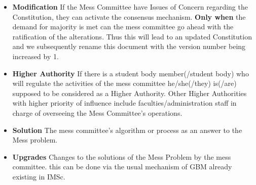 \documentclass[12pt]{report}
\begin{document}
\begin{itemize}
\item{\textbf{Modification}\label{mod}} If the Mess Committee have Issues of Concern regarding the Constitution, they can activate the consensus mechanism.  \textbf{Only when} the demand for majority is met can the mess committee go ahead with the ratification of the alterations. Thus this will lead to an updated Constitution and we subsequently rename this document with the version number being increased by 1.
\item{\textbf{Higher Authority}} If there is a student body member(/student body) who will regulate the activities of the mess committee he/she(/they) is(/are) supposed to be considered as a Higher Authority. Other Higher Authorities with higher priority of influence include faculties/administration staff in charge of overseeing the Mess Committee's operations. 

\item{\textbf{Solution}\label{sol}} The mess committee's algorithm or process as an answer to the Mess problem.

\item{\textbf{Upgrades} \label{upg}} Changes to the solutions of the Mess Problem by the mess committee. this can be done via the usual mechanism of GBM already existing in IMSc.


\end{itemize}
\end{document}
